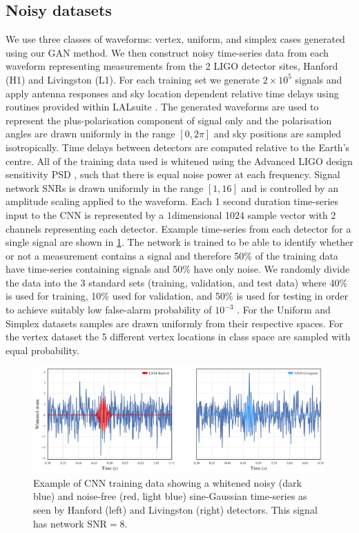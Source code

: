 \documentclass[12pt]{iopart}
\newcommand{\ndimensional}[1]{$#1$\nobreakdash\discretionary{-}{-}{-}dimensional}
\begin{document}
\subsection{Noisy datasets} 
We use three classes of waveforms: vertex, uniform, and simplex cases generated using our \ac{GAN} method. We then construct noisy time-series data from each waveform representing measurements from the 2 LIGO detector sites, Hanford (H1) and Livingston (L1). For each training set we generate $2\times 10^5$ signals and apply antenna responses and sky location dependent relative time delays using routines provided within LALsuite \cite{lalsuite}. The generated waveforms are used to represent the plus-polarisation component of signal only and the polarisation angles are drawn uniformly in the range $[0,2\pi]$ and sky positions are sampled isotropically. Time delays between detectors are computed relative to the Earth's centre. All of the training data used is whitened using the Advanced LIGO design sensitivity \ac{PSD} \cite{designcurve,observing-prospects}, such that there is equal noise power at each frequency. Signal network \acp{SNR} is drawn uniformly in the range $[1,16]$ and is controlled by an amplitude scaling applied to the waveform. Each 1 second duration time-series input to the \ac{CNN} is represented by a \ndimensional{1} 1024 sample vector with 2 channels representing each detector. Example time-series from each detector for a single signal are shown in \cref{fig:cnn_training}. The network is trained to be able to identify whether or not a measurement contains a signal and therefore 50\% of the training data have time-series containing signals and 50\% have only noise. We randomly divide the data into the 3 standard sets (training, validation, and test data) where 40\% is used for training, 10\% used for validation, and 50\% is used for testing in order to achieve suitably low false-alarm probability of $10^{-3}$ . For the Uniform and Simplex datasets samples are drawn uniformly from their respective spaces. For the vertex dataset the 5 different vertex locations in class space are sampled with equal probability.  

\begin{figure}[ht!]
    \centering
    \includegraphics[width=\textwidth]{figures/SNR8.png}
    \caption{Example of \ac{CNN} training data showing a whitened noisy (dark blue) and noise-free (red, light blue) sine-Gaussian time-series as seen by Hanford (left) and Livingston (right) detectors. This signal has network $\text{SNR}=8$.}
     \label{fig:cnn_training}
\end{figure}
\end{document}
